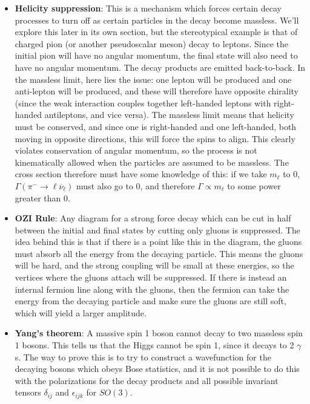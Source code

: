 \documentclass[11pt, oneside]{article}   	%
\theoremstyle{definition}
\numberwithin{equation}{subsection}		%
\begin{document}
\begin{itemize}
\item \textbf{Helicity suppression}: This is a mechanism which forces certain decay processes to turn off as certain particles in the decay 
become massless. We'll explore this later in its own section, but the stereotypical example is that of charged pion (or another pseudoscalar 
meson) decay to leptons. Since the initial pion will have no angular momentum, the final state will also need to have no angular momentum. 
The decay products are emitted back-to-back. In the massless limit, here lies the issue: one lepton will be produced and one anti-lepton will 
be produced, and these will therefore have opposite chirality (since the weak interaction couples together left-handed leptons with right-handed 
antileptons, and vice versa). The massless limit means that helicity must be conserved, and since one is right-handed and one left-handed, 
both moving in opposite directions, this will force the spins to align. This clearly violates conservation of angular momentum, so the process 
is not kinematically allowed when the particles are assumed to be massless. The cross section therefore must have some knowledge of this: 
if we take $m_\ell$ to 0, $\Gamma(\pi^-\rightarrow\ell\overline\nu_\ell)$ must also go to 0, and therefore $\Gamma\propto m_\ell$ to some 
power greater than 0. 

\item \textbf{OZI Rule}: Any diagram for a strong force decay which can be cut in half between the initial and final states by cutting only 
gluons is suppressed. The idea behind this is that if there is a point like this in the diagram, the gluons must absorb all the energy 
from the decaying particle. This means the gluons will be hard, and the strong coupling will be small at these energies, so the 
vertices where the gluons attach will be suppressed. If there is instead an internal fermion line along with the gluons, then the fermion 
can take the energy from the decaying particle and make sure the gluons are still soft, which will yield a larger amplitude. 

\item \textbf{Yang's theorem}: A massive spin 1 boson cannot decay to two massless spin 1 bosons. This tells us that the Higgs cannot be 
spin 1, since it decays to 2 $\gamma$s. The way to prove this is to try to construct a wavefunction for the decaying bosons which 
obeys Bose statistics, and it is not possible to do this with the polarizations for the decay products and all possible invariant 
tensors $\delta_{ij}$ and $\epsilon_{ijk}$ for $SO(3)$. 


\end{itemize}
\end{document}
